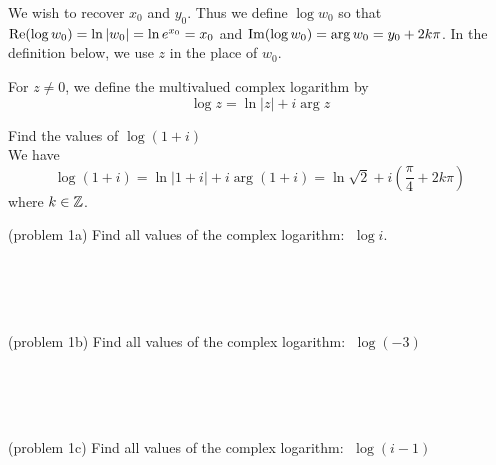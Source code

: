 \documentclass[handout]{ximera}
\begin{document}
We wish to recover $x_0$ and $y_0$.  Thus we define $\log w_0$ so that $\operatorname{Re}(\log w_0) = \ln|w_0| = \ln e^{x_0} = x_0$ and 
$\operatorname{Im}(\log w_0) = \arg w_0 = y_0 + 2k\pi$. 
In the definition below, we use $z$ in the place of $w_0$.
\begin{definition}
For $z \neq 0$, we define the multivalued complex logarithm by
\[
\log z = \ln |z| + i \arg z
\]
\end{definition}

\begin{example}[example 1]
Find the values of $\log(1+i)$\\
We have 
\[
\log(1+i) = \ln |1+i| + i \arg(1+i) = \ln \sqrt 2 + i\left(\frac{\pi}{4} + 2k\pi\right)
\]
where $k \in \mathbb Z$.
\end{example}

\begin{problem}(problem 1a)
Find all values of the complex logarithm: $\; \log i$.\\
\begin{multipleChoice}
\\
\\
\\
\end{multipleChoice}
\end{problem}


\begin{problem}(problem 1b)
Find all values of the complex logarithm: $\; \log(-3)$\\
\begin{multipleChoice}
\\
\\
\\
\end{multipleChoice}
\end{problem}


\begin{problem}(problem 1c)
Find all values of the complex logarithm: $\; \log(i-1)$\\
\begin{multipleChoice}
\\
\\
\\
\end{multipleChoice}
\end{problem}
\end{document}
